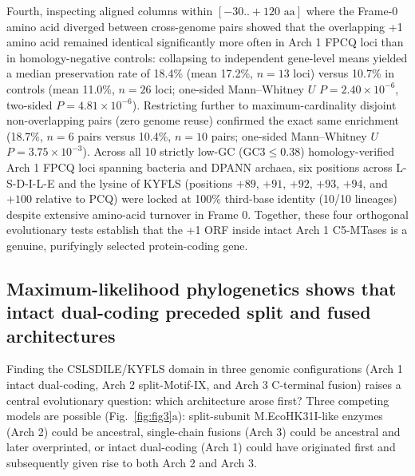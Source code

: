 \documentclass[10pt,letterpaper]{article}
\begin{document}
Fourth, inspecting aligned columns within $[-30..+120\text{ aa}]$ where the Frame-0 amino acid diverged between cross-genome pairs showed that the overlapping +1 amino acid remained identical significantly more often in Arch 1 FPCQ loci than in homology-negative controls: collapsing to independent gene-level means yielded a median preservation rate of 18.4\% (mean 17.2\%, $n = 13$ loci) versus 10.7\% in controls (mean 11.0\%, $n = 26$ loci; one-sided Mann--Whitney $U$ $P = 2.40 \times 10^{-6}$, two-sided $P = 4.81 \times 10^{-6}$). Restricting further to maximum-cardinality disjoint non-overlapping pairs (zero genome reuse) confirmed the exact same enrichment (18.7\%, $n = 6$ pairs versus 10.4\%, $n = 10$ pairs; one-sided Mann--Whitney $U$ $P = 3.75 \times 10^{-3}$). Across all 10 strictly low-GC ($\text{GC3} \le 0.38$) homology-verified Arch 1 FPCQ loci spanning bacteria and DPANN archaea, six positions across L-S-D-I-L-E and the lysine of KYFLS (positions $+89$, $+91$, $+92$, $+93$, $+94$, and $+100$ relative to PCQ) were locked at 100\% third-base identity (10/10 lineages) despite extensive amino-acid turnover in Frame 0. Together, these four orthogonal evolutionary tests establish that the +1 ORF inside intact Arch 1 C5-MTases is a genuine, purifyingly selected protein-coding gene.

\subsection{Maximum-likelihood phylogenetics shows that intact dual-coding preceded split and fused architectures}

Finding the CSLSDILE/KYFLS domain in three genomic configurations (Arch 1 intact dual-coding, Arch 2 split-Motif-IX, and Arch 3 C-terminal fusion) raises a central evolutionary question: which architecture arose first? Three competing models are possible (Fig.~\ref{fig:fig3}a): split-subunit M.EcoHK31I-like enzymes (Arch 2) could be ancestral, single-chain fusions (Arch 3) could be ancestral and later overprinted, or intact dual-coding (Arch 1) could have originated first and subsequently given rise to both Arch 2 and Arch 3.
\end{document}
